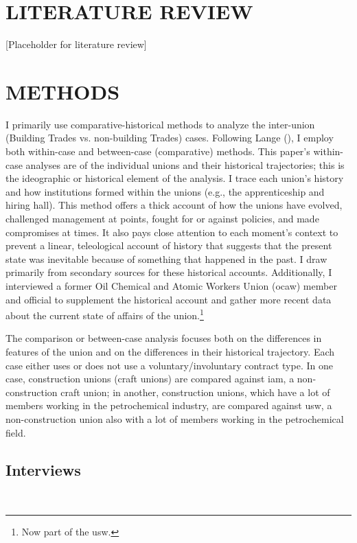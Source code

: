 \documentclass[12pt]{article}
\newcommand{\acrparen}[1]{(\acrshort{#1})}
\begin{document}
\section{LITERATURE REVIEW}

{\color{red}[Placeholder for literature review]}

\section{METHODS}

I primarily use comparative-historical methods to analyze the inter-union (Building Trades vs. non-building Trades) cases. Following Lange (\citeyear{langeComparativeHistoricalMethods2013}), I employ both within-case and between-case (comparative) methods. This paper's within-case analyses are of the individual unions and their historical trajectories; this is the ideographic or historical element of the analysis. I trace each union's history and how institutions formed within the unions (e.g., the apprenticeship and hiring hall). This method offers a thick account of how the unions have evolved, challenged management at points, fought for or against policies, and made compromises at times. It also pays close attention to each moment's context to prevent a linear, teleological account of history that suggests that the present state was inevitable because of something that happened in the past. I draw primarily from secondary sources for these historical accounts. Additionally, I interviewed a former Oil Chemical and Atomic Workers Union \acrparen{ocaw} member and official to supplement the historical account and gather more recent data about the current state of affairs of the union.\footnote{Now part of the \acrfull{usw}.}

The comparison or between-case analysis focuses both on the differences in features of the union and on the differences in their historical trajectory. Each case either uses or does not use a voluntary/involuntary contract type. In one case, construction unions (craft unions) are compared against \acrfull{iam}, a non-construction craft union; in another, construction unions, which have a lot of members working in the petrochemical industry, are compared against \acrfull{usw}, a non-construction union also with a lot of members working in the petrochemical field.

\subsection{Interviews}\
\end{document}
